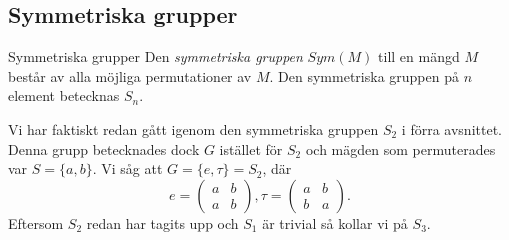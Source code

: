 \documentclass{article}
\theoremstyle{definition}
\begin{document}
\subsection{Symmetriska grupper}
\begin{mydef}{Symmetriska grupper}{}
  Den \textit{symmetriska gruppen} $Sym(M)$ till en mängd $M$ består av alla möjliga permutationer
  av $M.$ Den symmetriska gruppen på $n$ element betecknas $S_n.$    
\end{mydef}
Vi har faktiskt redan gått igenom den symmetriska gruppen $S_2$ i förra avsnittet. 
Denna grupp betecknades dock $G$ istället för $S_2$ och mägden som permuterades var $S = \{a, b\}.$
Vi såg att $G = \{e, \tau\} = S_2$, där 
\[e = 
\begin{pmatrix}
  a & b \\
  a & b
\end{pmatrix},
\tau = 
\begin{pmatrix}
  a & b \\
  b & a
\end{pmatrix}.
\]
Eftersom $S_2$ redan har tagits upp och $S_1$ är trivial så kollar vi på $S_3$.
\hypertarget{exempel4.2}{}
\end{document}
